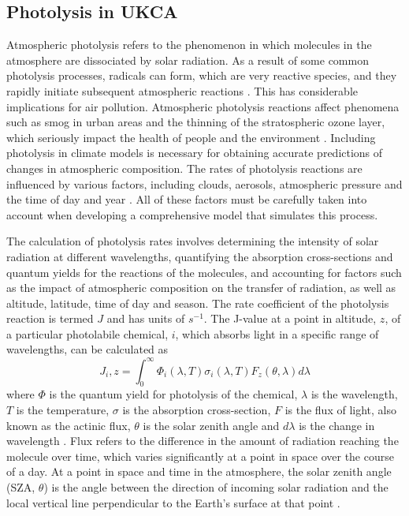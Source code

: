 \documentclass[journal abbreviation, manuscript]{copernicus}
\begin{document}


\introduction %

\subsection{Photolysis in UKCA}

Atmospheric photolysis refers to the phenomenon in which molecules in the atmosphere are dissociated by solar radiation. As a result of some common photolysis processes, radicals can form, which are very reactive species, and they rapidly initiate subsequent atmospheric reactions \citep{finlayson-pitts_chemistry_2000}. This has considerable implications for air pollution. Atmospheric photolysis reactions affect phenomena such as smog in urban areas and the thinning of the stratospheric ozone layer, which seriously impact the health of people and the environment \citep{seinfeld_atmospheric_2016}. Including photolysis in climate models is necessary for obtaining accurate predictions of changes in atmospheric composition. The rates of photolysis reactions are influenced by various factors, including clouds, aerosols, atmospheric pressure and the time of day and year \citep{liang_chemical_2013}. All of these factors must be carefully taken into account when developing a comprehensive model that simulates this process.

The calculation of photolysis rates involves determining the intensity of solar radiation at different wavelengths, quantifying the absorption cross-sections and quantum yields for the reactions of the molecules, and accounting for factors such as the impact of atmospheric composition on the transfer of radiation, as well as altitude, latitude, time of day and season. The rate coefficient of the photolysis reaction is termed $J$ and has units of $s^{-1}$.  The J-value at a point in altitude, $z$, of a particular photolabile chemical, $i$, which absorbs light in a specific range of wavelengths, can be calculated as
\begin{equation}
J_i,z = \int_{0}^{\infty} \Phi_i (\lambda, T) \sigma_i (\lambda, T) F_z (\theta, \lambda) d \lambda 
\end{equation}
where $\Phi$ is the quantum yield for photolysis of the chemical, $\lambda$ is the wavelength, $T$ is the temperature, $\sigma$ is the absorption cross-section, $F$ is the flux of light, also known as the actinic flux, $\theta$ is the solar zenith angle and $d \lambda$ is the change in wavelength \citep{king_calculating_2013}. Flux refers to the difference in the amount of radiation reaching the molecule over time, which varies significantly at a point in space over the course of a day.
At a point in space and time in the atmosphere, the solar zenith angle (SZA, $\theta$) is the angle between the direction of incoming solar radiation and the local vertical line perpendicular to the Earth's surface at that point \citep{finlayson-pitts_chemistry_2000}. 
\end{document}
